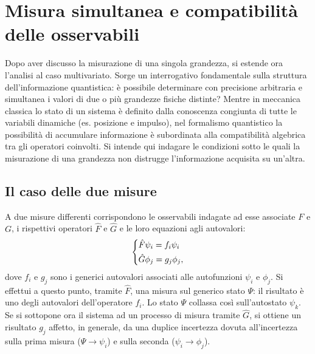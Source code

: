 \documentclass[a4paper,11pt]{report}
\begin{document}
\section{Misura simultanea e compatibilità delle osservabili}
Dopo aver discusso la misurazione di una singola grandezza, si estende ora l'analisi al caso multivariato. Sorge un interrogativo fondamentale sulla struttura dell'informazione quantistica: è possibile determinare con precisione arbitraria e simultanea i valori di due o più grandezze fisiche distinte?
Mentre in meccanica classica lo stato di un sistema è definito dalla conoscenza congiunta di tutte le variabili dinamiche (es. posizione e impulso), nel formalismo quantistico la possibilità di accumulare informazione è subordinata alla compatibilità algebrica tra gli operatori coinvolti.
Si intende qui indagare le condizioni sotto le quali la misurazione di una grandezza non distrugge l'informazione acquisita su un'altra.

\subsection{Il caso delle due misure}
A due misure differenti corrispondono le osservabili indagate ad esse associate $F$ e $G$, i rispettivi operatori $\hat{F}$ e $\hat{G}$ e le loro equazioni agli autovalori:
\begin{equation}
\begin{dcases}
    \hat{F}\psi_i = f_i\psi_i \\
    \hat{G}\phi_j = g_j \phi_j,
    \end{dcases}
\end{equation}
dove $f_i$ e $g_j$ sono i generici autovalori associati alle autofunzioni $\psi_i$ e $\phi_j$. Si effettui a questo punto, tramite $\hat{F}$, una misura sul generico stato $\Psi$: il risultato è uno degli autovalori dell'operatore $f_i$. Lo stato $\Psi$ collassa così sull'autostato $\psi_k$. Se si sottopone ora il sistema ad un processo di misura tramite $\hat{G}$, si ottiene un risultato $g_j$ affetto, in generale, da una duplice incertezza dovuta all'incertezza sulla prima misura ($\Psi \to \psi_i$) e sulla seconda ($\psi_i \to \phi_j$). \\
\end{document}
